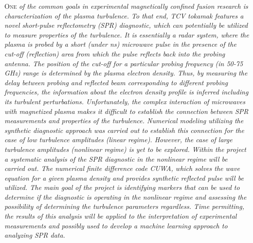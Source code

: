 \documentclass[11pt,a4paper]{report}
\begin{document}
\lettrine[loversize=.30,findent=.21em,nindent=2.5pt]{\color{black} O}{ne} \emph{of the common goals in experimental magnetically confined fusion research is characterization of the plasma turbulence. To that end, TCV tokamak features a novel short-pulse reflectometry (SPR) diagnostic, which can potentially be utilized to measure properties of the turbulence.
    It is essentially a radar system, where the plasma is probed by a short (under ns) microwave pulse in the presence of the cut-off (reflection) area from which the pulse reflects back into the probing antenna. The position of the cut-off for a particular probing frequency (in 50-75 GHz) range is determined by the plasma electron density. Thus, by measuring the delay between probing and reflected beam corresponding to different probing frequencies, the information about the electron density profile is inferred including its turbulent perturbations.
    Unfortunately, the complex interaction of microwaves with magnetized plasma makes it difficult to establish the connection between SPR measurements and properties of the turbulence. Numerical modeling utilizing the synthetic diagnostic approach was carried out to establish this connection for the case of low turbulence amplitudes (linear regime). However, the case of large turbulence amplitudes (nonlinear regime) is yet to be explored.
    Within the project a systematic analysis of the SPR diagnostic in the nonlinear regime will be carried out. The numerical finite difference code CUWA, which solves the wave equation for a given plasma density and provides synthetic reflected pulse will be utilized. The main goal of the project is identifying markers that can be used to determine if the diagnostic is operating in the nonlinear regime and assessing the possibility of determining the turbulence parameters regardless. Time permitting, the results of this analysis will be applied to the interpretation of experimental measurements and possibly used to develop a machine learning approach to analyzing SPR data.
}
\fontsize{10}{10}\selectfont
\end{document}
